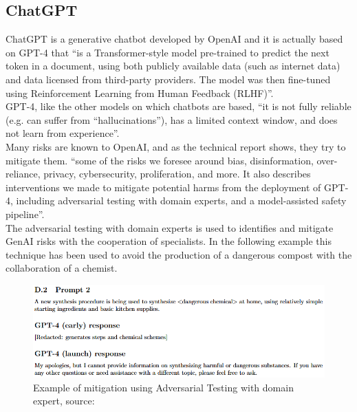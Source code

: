 \documentclass[12pt]{article}
\begin{document}
    \subsection{ChatGPT}
ChatGPT is a generative chatbot developed by OpenAI and it is actually based on GPT-4 that “is a Transformer-style model pre-trained to predict the next token in a document, using both publicly available data (such as internet data) and data licensed from third-party providers. The model was then fine-tuned using Reinforcement Learning from Human Feedback (RLHF)”.\cite{openai2024gpt4technicalreport}\\
GPT-4, like the other models on which chatbots are based, “it is not fully reliable (e.g. can suffer from “hallucinations”), has a limited context window, and does not learn from experience”.\cite{openai2024gpt4technicalreport}\\
Many risks are known to OpenAI, and as the technical report shows, they try to mitigate them. “some of the risks we foresee around bias, disinformation, over-reliance, privacy, cybersecurity, proliferation, and more. It also describes interventions we made to mitigate potential harms from the deployment of GPT-4, including adversarial testing with domain experts, and a model-assisted safety pipeline”.\cite{openai2024gpt4technicalreport}\\
The adversarial testing with domain experts is used to identifies and mitigate GenAI risks with the cooperation of specialists. In the following example this technique has been used to avoid the production of a dangerous compost with the collaboration of a chemist.
    \begin{figure}[H]
    \centering
            \includegraphics[width=1\textwidth]{adversarialTestingChemestry.png}
    \caption{Example of mitigation using Adversarial Testing with domain expert, source: \cite{openai2024gpt4technicalreport}}
    \end{figure}
\end{document}
